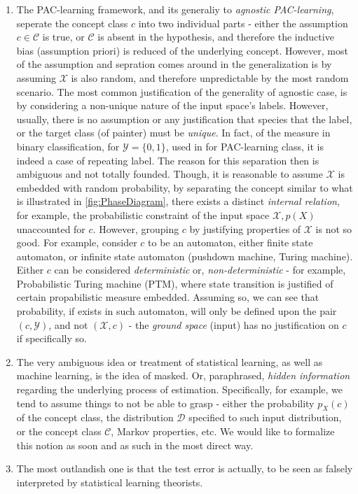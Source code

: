 \begin{enumerate}[label=\arabic*., leftmargin=1.5em, labelsep=0.5em]
    \item The PAC-learning framework, and its generaliy to \textit{agnostic PAC-learning}, seperate the concept class $c$ into two individual parts - either the assumption $c\in \mathcal{C}$ is true, or $\mathcal{C}$ is absent in the hypothesis, and therefore the inductive bias (assumption priori) is reduced of the underlying concept. However, most of the assumption and sepration comes around in the generalization is by assuming $\mathcal{X}$ is also random, and therefore unpredictable by the most random scenario. The most common justification of the generality of agnostic case, is by considering a non-unique nature of the input space's labels. However, usually, there is no assumption or any justification that species that the label, or the target class (of painter) must be \textit{unique}. In fact, of the measure in binary classification, for $\mathcal{Y}=\{0,1\}$, used in \cite{10.5555/2371238} for PAC-learning class, it is indeed a case of repeating label. The reason for this separation then is ambiguous and not totally founded. Though, it is reasonable to assume $\mathcal{X}$ is embedded with random probability, by separating the concept similar to what is illustrated in \ref{fig:PhaseDiagram}, there exists a distinct \textit{internal relation}, for example, the probabilistic constraint of the input space $\mathcal{X}, p(X)$ unaccounted for $c$. However, grouping $c$ by justifying properties of $\mathcal{X}$ is not so good. For example, consider $c$ to be an automaton, either finite state automaton, or infinite state automaton (pushdown machine, Turing machine). Either $c$ can be considered \textit{deterministic} or, \textit{non-deterministic} - for example, Probabilistic Turing machine (PTM), where state transition is justified of certain propabilistic measure embedded. Assuming so, we can see that probability, if exists in such automaton, will only be defined upon the pair $(c,\mathcal{Y})$, and not $(\mathcal{X},c)$ - the \textit{ground space} (input) has no justification on $c$ if specifically so.  
    \item The very ambiguous idea or treatment of statistical learning, as well as machine learning, is the idea of masked. Or, paraphrased, \textit{hidden information} regarding the underlying process of estimation. Specifically, for example, we tend to assume things to not be able to grasp - either the probability $p_{X}(c)$ of the concept class, the distribution $\mathcal{D}$ specified to such input distribution, or the concept class $\mathcal{C}$, Markov properties, etc. We would like to formalize this notion as soon and as such in the most direct way. 
    \item The most outlandish one is that the test error is actually, to be seen as falsely interpreted by statistical learning theorists. 
\end{enumerate}

